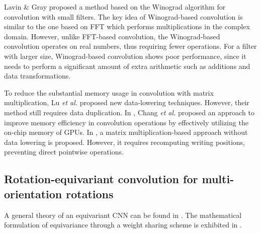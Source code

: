 Lavin \& Gray \cite{Lavin} proposed a method based on the Winograd algorithm \cite{winograd} for convolution with small filters. The key idea of Winograd-based convolution is similar to the one based on FFT which performs multiplications in the complex domain. However, unlike FFT-based convolution, the Winograd-based convolution operates on real numbers, thus requiring fewer operations. 
For a filter with larger size, Winograd-based convolution shows poor performance, since it needs to perform a significant amount of extra arithmetic such as additions and data transformations.

To reduce the substantial memory usage in convolution with matrix multiplication, Lu \textit{et al.} \cite{lu2023im2win} proposed new data-lowering techniques. However, their method still requires data duplication. In \cite{10.5555/3213069.3213072}, Chang \textit{et al.} proposed an approach to improve memory efficiency in convolution operations by effectively utilizing the on-chip memory of GPUs. In \cite{9235051}, a matrix multiplication-based approach without data lowering is proposed. However, it requires recomputing writing positions, preventing direct pointwise operations.


\subsection{Rotation-equivariant convolution for multi-orientation rotations} \label{subsec:rot-conv}
A general theory of an equivariant CNN can be found in \cite{cohen2018general}. The mathematical formulation of equivariance through a weight sharing scheme is exhibited in \cite{equi-theory}.


